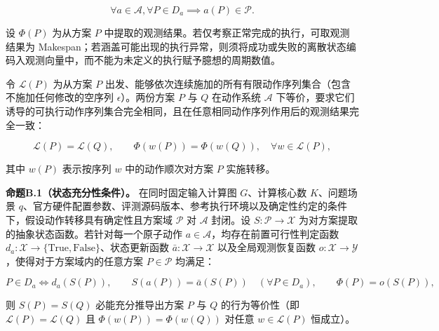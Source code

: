 \documentclass[anonymous,notoc]{gmcm2026}
\begin{document}
\begin{equation}
\forall a \in \mathcal{A}, \forall P \in D_a \implies a(P) \in \mathcal{P}.
\end{equation}

设 \(\Phi(P)\) 为从方案 \(P\) 中提取的观测结果。若仅考察正常完成的执行，可取观测结果为 Makespan；若涵盖可能出现的执行异常，则须将成功或失败的离散状态编码入观测向量中，而不能为未定义的执行赋予臆想的周期数值。

令 \(\mathcal{L}(P)\) 为从方案 \(P\) 出发、能够依次连续施加的所有有限动作序列集合（包含不施加任何修改的空序列 \(\epsilon\)）。两份方案 \(P\) 与 \(Q\) 在动作系统 \(\mathcal{A}\) 下等价，要求它们诱导的可执行动作序列集合完全相同，且在任意相同动作序列作用后的观测结果完全一致：

\begin{equation}
\mathcal{L}(P) = \mathcal{L}(Q), \qquad \Phi(w(P)) = \Phi(w(Q)), \quad \forall w \in \mathcal{L}(P),
\end{equation}

其中 \(w(P)\) 表示按序列 \(w\) 中的动作顺次对方案 \(P\) 实施转移。

\textbf{命题B.1（状态充分性条件）。} 在同时固定输入计算图 \(G\)、计算核心数 \(K\)、问题场景 \(q\)、官方硬件配置参数、评测源码版本、参考执行环境以及确定性约定的条件下，假设动作转移具有确定性且方案域 \(\mathcal{P}\) 对 \(\mathcal{A}\) 封闭。设 \(S: \mathcal{P} \to \mathcal{X}\) 为对方案提取的抽象状态函数。若针对每一个原子动作 \(a \in \mathcal{A}\)，均存在前置可行性判定函数 \(d_a: \mathcal{X} \to \{\text{True}, \text{False}\}\)、状态更新函数 \(\bar{a}: \mathcal{X} \to \mathcal{X}\) 以及全局观测恢复函数 \(o: \mathcal{X} \to \mathcal{Y}\)，使得对于方案域内的任意方案 \(P \in \mathcal{P}\) 均满足：

\begin{equation}
P \in D_a \iff d_a(S(P)), \qquad S(a(P)) = \bar{a}(S(P)) \quad (\forall P \in D_a), \qquad \Phi(P) = o(S(P)),
\end{equation}

则 \(S(P) = S(Q)\) 必能充分推导出方案 \(P\) 与 \(Q\) 的行为等价性（即 \(\mathcal{L}(P) = \mathcal{L}(Q)\) 且 \(\Phi(w(P)) = \Phi(w(Q))\) 对任意 \(w \in \mathcal{L}(P)\) 恒成立）。
\end{document}
